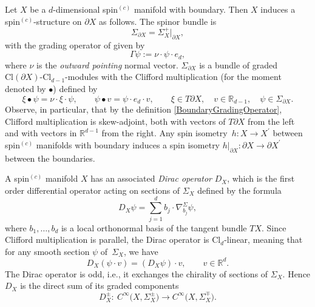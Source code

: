 \documentclass[pdftex]{sigma}
\numberwithin{equation}{section}
\newcommand{\R}{\mathbb{R}}
\newcommand{\Cl}{\mathrm{Cl}}
\begin{document}
\begin{Construction}
Let $X$ be a $d$-dimensional spin$^{(c)}$ manifold with boundary.
Then $X$ induces a spin$^{(c)}$-structure on $\partial X$ as follows.
The spinor bundle is
\begin{equation*}
 \Sigma_{\partial X} = \Sigma_X^+|_{\partial X},
\end{equation*}
with the grading operator of given by
\begin{equation} \label{BoundaryGradingOperator}
\Gamma\psi := \nu \cdot \psi \cdot e_d,
\end{equation}
where $\nu$ is the \emph{outward pointing} normal vector.
$\Sigma_{\partial X}$ is a bundle of graded $\Cl(\partial X)$-$\Cl_{d-1}$-modules with the Clifford multiplication (for the moment denoted by $\bullet$) defined by
\begin{equation*}
 \xi \bullet \psi = \nu \cdot \xi \cdot \psi, \qquad \psi \bullet v = \psi \cdot e_d \cdot v, \qquad \xi \in T\partial X, \quad v \in \R_{d-1},\quad \psi \in \Sigma_{\partial X}.
\end{equation*}
Observe, in particular, that by the definition \eqref{BoundaryGradingOperator}, Clifford multiplication is skew-adjoint, both with vectors of $T\partial X$ from the left and with vectors in $\R^{d-1}$ from the right.
Any spin isometry~${h\colon X \to X^\prime}$ between spin$^{(c)}$ manifolds with boundary induces a spin isometry $h|_{\partial X}\colon \partial X \to \partial X^\prime$ between the boundaries.
\end{Construction}




A spin$^{(c)}$ manifold $X$ has an associated \emph{Dirac operator} $D_X$, which is the first order differential operator acting on sections of $\Sigma_X$ defined by the formula
\begin{equation*}%
 D_X \psi = \sum_{j=1}^d b_j \cdot \nabla^\Sigma_{b_j} \psi,
\end{equation*}
where $b_1, \dots, b_d$ is a local orthonormal basis of the tangent bundle $TX$.
Since Clifford multiplication is parallel, the Dirac operator is $\Cl_d$-linear, meaning that for any smooth section $\psi$ of~$\Sigma_X$, we have
\begin{equation*}
 D_X(\psi \cdot v) = (D_X \psi) \cdot v, \qquad v \in \R^d.
\end{equation*}
The Dirac operator is odd, i.e., it exchanges the chirality of sections of $\Sigma_X$.
Hence $D_X$ is the direct sum of its graded components
\begin{equation*}
 D^{\pm}_X \colon\ C^\infty\big(X, \Sigma^\pm_X\big) \longrightarrow C^\infty\big(X, \Sigma^\mp_X\big).
\end{equation*}
\end{document}
